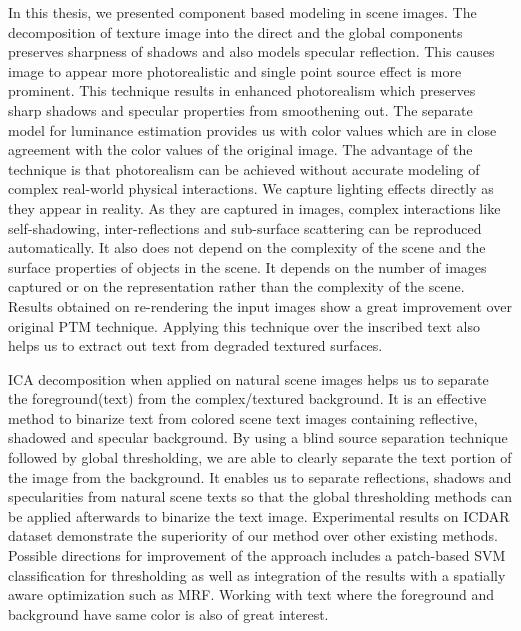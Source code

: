 In this thesis, we presented component based modeling in scene images. The decomposition
of texture image into the direct and the global components preserves sharpness of shadows and also models
specular reflection. This causes image to appear more photorealistic and single
point source effect is more prominent. This technique results in enhanced
photorealism which preserves sharp shadows and specular properties from
smoothening out. The separate model for luminance estimation provides us with
color values which are in close agreement with the color values of the original
image. The advantage of the technique is that photorealism can be achieved 
without accurate modeling of complex real-world physical interactions. We capture
lighting effects directly as they appear in reality. As they are captured in images, complex
interactions like self-shadowing, inter-reflections and sub-surface scattering can be reproduced automatically. It also does not
depend on the complexity of the scene and the surface properties of objects in the scene. 
It depends on the number of images captured or on the representation rather than the complexity of the scene. 
Results obtained on re-rendering the input images show a great
improvement over original PTM technique. Applying this technique over the inscribed text also helps us to extract
out text from degraded textured surfaces.

ICA decomposition when applied on natural scene images helps us to separate the foreground(text) from the complex/textured background.
It is an effective method to binarize text from colored scene text images containing reflective, shadowed and specular
background. By using a blind source separation technique followed by global thresholding, we are able to clearly separate
the text portion of the image from the background. It enables us to separate reflections, shadows and 
specularities from natural scene texts so that the global thresholding methods can be applied afterwards to binarize the 
text image. Experimental results on ICDAR dataset demonstrate the superiority of our method over other existing methods. 
Possible directions for improvement of the approach includes a patch-based SVM classification for thresholding as well
as integration of the results with a spatially aware optimization such as MRF. Working with text where the foreground and
background have same color is also of great interest.
 


